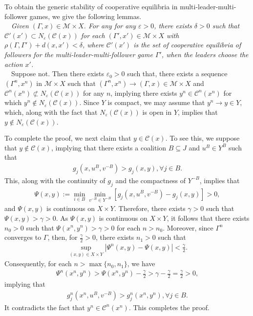 To obtain the generic stability of cooperative equilibria
in multi-leader-multi-follower games, we give the following lemmas.
\\

~~{\it Given $(\Gamma,x)\in \mathcal{M}\times X$.
For any for any $\varepsilon>0$, there exists $\delta>0$ such that
$\mathcal{C}'(x')\subset N_\varepsilon(\mathcal{C}(x))$ for each
$(\Gamma',x')\in \mathcal{M}\times X$ with $\rho(\Gamma,\Gamma')+d(x,x')<\delta$,
where
$\mathcal{C}'(x')$ is the set of cooperative equilibria
of followers for the multi-leader-multi-follower game
$\Gamma'$, when the leaders choose the action $x'$.}
\\

~~Suppose not. Then there exists $\varepsilon_0>0$ such
that, there exists a sequence $(\Gamma^n,x^n)$ in $\mathcal{M}\times X$
such that $(\Gamma^n,x^n)\longrightarrow (\Gamma,x)\in \mathcal{M}\times X$
and $\mathcal{C}^n(x^n)\not\subset N_\varepsilon(\mathcal{C}(x))$ for any $n$,
implying there exists $y^n\in \mathcal{C}^n(x^n)$ for which
$y^n\not\in N_\varepsilon(\mathcal{C}(x))$. Since $Y$ is compact,
we may assume that $y^n\longrightarrow y\in Y$, which, along with
the fact that $N_\varepsilon(\mathcal{C}(x))$
is open in $Y$, implies that $y\not\in N_\varepsilon(\mathcal{C}(x))$.

To complete the proof, we next claim that $y\in \mathcal{C}(x)$. To see this,
we suppose that $y\not\in \mathcal{C}(x)$, implying that
there exists a coalition $B\subseteq J$ and $u^B\in Y^B$ such that
\begin{eqnarray*}
g_j(x,u^B,v^{-B})>g_j(x,y),\forall j\in B.
\end{eqnarray*}
This, along with the continuity of $g_j$ and the compactness of $Y^{-B}$, implies
that
\begin{eqnarray*}
\Psi(x,y):=\min_{i\in B}\min_{v^{-B}\in Y^{-B}}[g_j(x,u^B,v^{-B})-g_j(x,y)]>0,
\end{eqnarray*}
and $\Psi(x,y)$
is continuous on $X\times Y$. Therefore, there exists $\gamma>0$ such that
$\Psi(x,y)>\gamma>0$. As $\Psi(x,y)$
is continuous on $X\times Y$, it follows that there exists $n_0>0$ such that
$\Psi(x^n,y^n)>\gamma>0$ for each $n>n_0$. Moreover, since $\Gamma^n$ converges to $\Gamma$,
then, for $\frac{\gamma}{2}>0$, there exists $n_1>0$ such that
\begin{eqnarray*}
\sup_{(x,y)\in X\times Y}|\Psi^n(x,y)-\Psi(x,y)|<\frac{\gamma}{2}.
\end{eqnarray*}
Consequently, for each $n>\max\{n_0,n_1\}$, we have
\begin{eqnarray*}
\Psi^n(x^n,y^n)>\Psi(x^n,y^n)-\frac{\gamma}{2}>\gamma-\frac{\gamma}{2}=\frac{\gamma}{2}>0,
\end{eqnarray*}
implying that
\begin{eqnarray*}
g^n_j(x^n,u^B,v^{-B})>g^n_j(x^n,y^n),\forall j\in B.
\end{eqnarray*}
It contradicts the fact that $y^n\in \mathcal{C}^n(x^n)$.
This completes the proof.
\\


